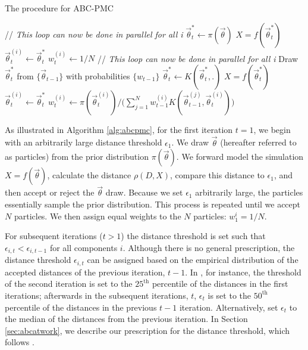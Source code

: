 \documentclass[fleqn,usenatbib]{mnras}
\newcommand{\pars}{\vec{\theta}}
\begin{document}
\begin{algorithm} 
\caption{The procedure for ABC-PMC}
\begin{algorithmic}[1] \label{alg:abcpmc}
   \STATE // \emph{This loop can now be done in parallel for all i}
   \STATE $\pars^{*}_{t} \gets \pi(\pars)$
   \STATE $X = f(\pars^{*}_{t})$
   \ENDWHILE
   \STATE $\pars^{(i)}_{t} \gets \pars^{*}_{t}$
   \STATE $w^{(i)}_{t} \gets 1/N$
\ENDFOR
\ENDIF
{}
   \STATE // \emph{This loop can now be done in parallel for all i}
   \STATE Draw $\pars^{*}_{t}$ from $\{\pars_{t-1}\}$ with probabilities $\{w_{t-1}\}$
   \STATE $\pars^{*}_{t} \gets K(\pars^{*}_{t},.)$
   \STATE $X = f(\pars^{*}_{t})$
   \ENDWHILE
   \STATE $\pars^{(i)}_{t} \gets \pars^{*}_{t}$
   \STATE $w^{(i)}_{t} \gets \pi(\pars^{(i)}_{t}) / \big(\sum\limits_{j=1}^{N}w_{t-1}^{(i)}K(\pars^{(j)}_{t-1},\pars^{(i)}_{t}) \big)$
\ENDFOR
\ENDIF
\end{algorithmic}
\end{algorithm}

As illustrated in Algorithm \ref{alg:abcpmc}, for the first iteration $t = 1$, 
we begin with an arbitrarily large distance threshold $\epsilon_1$. We 
draw $\pars$ (hereafter referred to as particles) from the prior distribution 
$\pi(\pars)$. We forward model the simulation $X = f(\pars)$, calculate the 
distance $\rho(D, X)$, compare this distance to $\epsilon_1$, and then 
accept or reject the $\pars$ draw. Because we set $\epsilon_1$ arbitrarily large, 
the particles essentially sample the prior distribution. This process 
is repeated until we accept $N$ particles. We then assign equal weights to 
the $N$ particles: $w_1^i = 1/N$.

For subsequent iterations ($t > 1$) the distance threshold is set such that
$\epsilon_{i,t} < \epsilon_{i,t-1}$ for all components $i$. Although there is 
no general prescription, the distance threshold $\epsilon_{i,t}$ can be 
assigned based on the empirical distribution of the accepted distances of the 
previous iteration, $t-1$. In \citealt{abcsn}, for instance, the threshold of 
the second iteration is set to the $25^\mathrm{th}$ percentile of the distances 
in the first iterations; afterwards in the subsequent iterations, $t$, $\epsilon_{t}$ 
is set to the $50^\mathrm{th}$ percentile of the distances in the previous $t-1$ iteration. 
Alternatively, \citealt{abcwl} set $\epsilon_{t}$ to the median of the distances from 
the previous iteration. In Section \ref{sec:abcatwork}, we describe our prescription 
for the distance threshold, which follows \citealt{abcwl}. 
\end{document}

